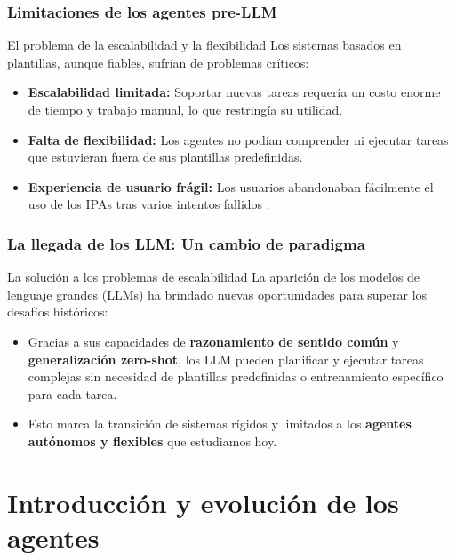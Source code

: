 \documentclass[handout]{beamer}
\begin{document}
\begin{frame}
  \frametitle{Limitaciones de los agentes pre-LLM}
    \begin{alertblock}{El problema de la escalabilidad y la flexibilidad}
    Los sistemas basados en plantillas, aunque fiables, sufrían de problemas críticos:
    \begin{itemize}
        \item \textbf{Escalabilidad limitada:} Soportar nuevas tareas requería un costo enorme de tiempo y trabajo manual, lo que restringía su utilidad.
        \item \textbf{Falta de flexibilidad:} Los agentes no podían comprender ni ejecutar tareas que estuvieran fuera de sus plantillas predefinidas.
        \item \textbf{Experiencia de usuario frágil:} Los usuarios abandonaban fácilmente el uso de los IPAs tras varios intentos fallidos \parencite{li2024personalllmagentsinsights}.
    \end{itemize}
  \end{alertblock}
\end{frame}

\begin{frame}
  \frametitle{La llegada de los LLM: Un cambio de paradigma}
  \begin{alertblock}{La solución a los problemas de escalabilidad}
    La aparición de los modelos de lenguaje grandes (LLMs) ha brindado nuevas oportunidades para superar los desafíos históricos:
    \begin{itemize}
        \item Gracias a sus capacidades de \textbf{razonamiento de sentido común} y \textbf{generalización zero-shot}, los LLM pueden planificar y ejecutar tareas complejas sin necesidad de plantillas predefinidas o entrenamiento específico para cada tarea.
        \item Esto marca la transición de sistemas rígidos y limitados a los \textbf{agentes autónomos y flexibles} que estudiamos hoy.
    \end{itemize}
  \end{alertblock}
\end{frame}


\section{Introducción y evolución de los agentes}
\end{document}
